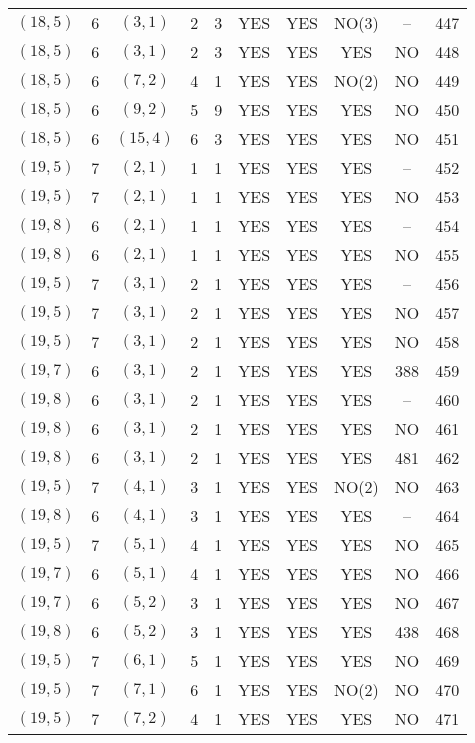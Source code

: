 \begin{longtable}{|c|c|c|c|c|c|c|c|c|c|}
$(18, 5)$ & 6 & $(3, 1)$ & 2 & 3 & YES & YES & NO(3) & -- & 447\\
$(18, 5)$ & 6 & $(3, 1)$ & 2 & 3 & YES & YES & YES & NO & 448\\
$(18, 5)$ & 6 & $(7, 2)$ & 4 & 1 & YES & YES & NO(2) & NO & 449\\
$(18, 5)$ & 6 & $(9, 2)$ & 5 & 9 & YES & YES & YES & NO & 450\\
$(18, 5)$ & 6 & $(15, 4)$ & 6 & 3 & YES & YES & YES & NO & 451\\
$(19, 5)$ & 7 & $(2, 1)$ & 1 & 1 & YES & YES & YES & -- & 452\\
$(19, 5)$ & 7 & $(2, 1)$ & 1 & 1 & YES & YES & YES & NO & 453\\
$(19, 8)$ & 6 & $(2, 1)$ & 1 & 1 & YES & YES & YES & -- & 454\\
$(19, 8)$ & 6 & $(2, 1)$ & 1 & 1 & YES & YES & YES & NO & 455\\
$(19, 5)$ & 7 & $(3, 1)$ & 2 & 1 & YES & YES & YES & -- & 456\\
$(19, 5)$ & 7 & $(3, 1)$ & 2 & 1 & YES & YES & YES & NO & 457\\
$(19, 5)$ & 7 & $(3, 1)$ & 2 & 1 & YES & YES & YES & NO & 458\\
$(19, 7)$ & 6 & $(3, 1)$ & 2 & 1 & YES & YES & YES & 388 & 459\\
$(19, 8)$ & 6 & $(3, 1)$ & 2 & 1 & YES & YES & YES & -- & 460\\
$(19, 8)$ & 6 & $(3, 1)$ & 2 & 1 & YES & YES & YES & NO & 461\\
$(19, 8)$ & 6 & $(3, 1)$ & 2 & 1 & YES & YES & YES & 481 & 462\\
$(19, 5)$ & 7 & $(4, 1)$ & 3 & 1 & YES & YES & NO(2) & NO & 463\\
$(19, 8)$ & 6 & $(4, 1)$ & 3 & 1 & YES & YES & YES & -- & 464\\
$(19, 5)$ & 7 & $(5, 1)$ & 4 & 1 & YES & YES & YES & NO & 465\\
$(19, 7)$ & 6 & $(5, 1)$ & 4 & 1 & YES & YES & YES & NO & 466\\
$(19, 7)$ & 6 & $(5, 2)$ & 3 & 1 & YES & YES & YES & NO & 467\\
$(19, 8)$ & 6 & $(5, 2)$ & 3 & 1 & YES & YES & YES & 438 & 468\\
$(19, 5)$ & 7 & $(6, 1)$ & 5 & 1 & YES & YES & YES & NO & 469\\
$(19, 5)$ & 7 & $(7, 1)$ & 6 & 1 & YES & YES & NO(2) & NO & 470\\
$(19, 5)$ & 7 & $(7, 2)$ & 4 & 1 & YES & YES & YES & NO & 471\\

\end{longtable}

